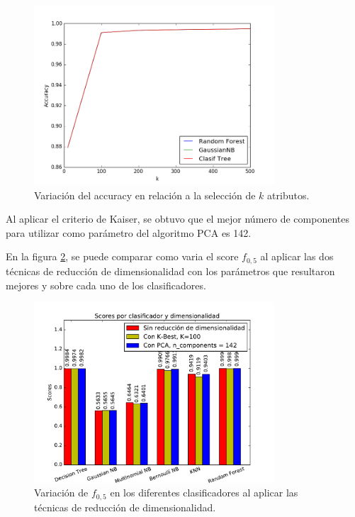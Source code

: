 \documentclass[hidelinks,a4paper,11pt, nofootinbib]{article}
\begin{document}
\begin{figure}[ht!]
    \centering
    \includegraphics[width=0.8\textwidth]{k_best.png}
    \caption{Variación del accuracy en relación a la selección de $k$ atributos.}
    \label{fig1}
\end{figure}

Al aplicar el criterio de Kaiser, se obtuvo que el mejor número de componentes para utilizar como parámetro del algoritmo PCA es 142.

En la figura \ref{fig2}, se puede comparar como varia el score $f_{0,5}$ al aplicar las dos técnicas de reducción de dimensionalidad con los parámetros que resultaron mejores y sobre cada uno de los clasificadores.

\begin{figure}[ht!]
    \centering
    \includegraphics[width=0.8\textwidth]{barplot.pdf}
    \caption{Variación de $f_{0,5}$ en los diferentes clasificadores al aplicar las técnicas de reducción de dimensionalidad.}
    \label{fig2}
\end{figure}
\end{document}

